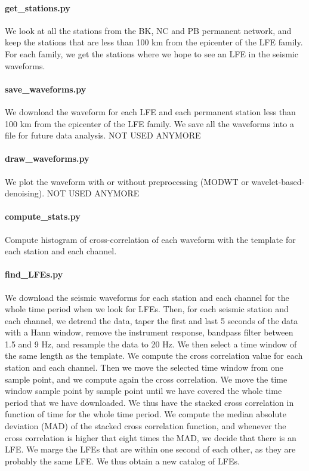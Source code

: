 \documentclass[workdone.tex]{subfiles}
\begin{document}
\paragraph{get\_stations.py} We look at all the stations from the BK, NC and PB permanent network, and keep the stations that are less than 100 km from the epicenter of the LFE family. For each family, we get the stations where we hope to see an LFE in the seismic waveforms.

\paragraph{save\_waveforms.py} We download the waveform for each LFE and each permanent station less than 100 km from the epicenter of the LFE family. We save all the waveforms into a file for future data analysis. NOT USED ANYMORE

\paragraph{draw\_waveforms.py} We plot the waveform with or without preprocessing (MODWT or wavelet-based-denoising). NOT USED ANYMORE

\paragraph{compute\_stats.py} Compute histogram of cross-correlation of each waveform with the template for each station and each channel.

\paragraph{find\_LFEs.py} We download the seismic waveforms for each station and each channel for the whole time period when we look for LFEs. Then, for each seismic station and each channel, we detrend the data, taper the first and last 5 seconds of the data with a Hann window, remove the instrument response, bandpass filter between 1.5 and 9 Hz, and resample the data to 20 Hz. We then select a time window of the same length as the template. We compute the cross correlation value for each station and each channel. Then we move the selected time window from one sample point, and we compute again the cross correlation. We move the time window sample point by sample point until we have covered the whole time period that we have downloaded. We thus have the stacked cross correlation in function of time for the whole time period. We compute the median absolute deviation (MAD) of the stacked cross correlation function, and whenever the cross correlation is higher that eight times the MAD, we decide that there is an LFE. We marge the LFEs that are within one second of each other, as they are probably the same LFE. We thus obtain a new catalog of LFEs.
\end{document}
